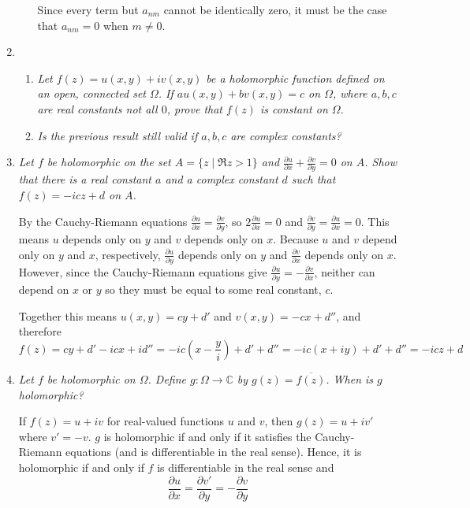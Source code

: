 \documentclass[letterpaper, 11pt]{article}
\begin{document}
\begin{enumerate}
\begin{enumerate}
Since every term but $a_{nm}$ cannot be identically zero, it must be the case that $a_{nm} = 0$ when $m \neq 0$.
\end{enumerate}

\item
\begin{enumerate}
\item \emph{Let $f(z) = u(x,y) + iv(x,y)$ be a holomorphic function defined on an open, connected set $\Omega$.  If $au(x,y) + bv(x,y) = c$ on $\Omega$, where $a,b,c$ are real constants not all $0$, prove that $f(z)$ is constant on $\Omega$.}
\item \emph{Is the previous result still valid if $a,b,c$ are complex constants?}
\end{enumerate}

\item \emph{Let $f$ be holomorphic on the set $A = \{z \mid \Re z > 1\}$ and $\frac{\partial u}{\partial x} + \frac{\partial v}{\partial y} = 0$ on $A$.  Show that there is a real constant $a$ and a complex constant $d$ such that $f(z) = -icz + d$ on $A$.}

By the Cauchy-Riemann equations $\frac{\partial u}{\partial x} = \frac{\partial v}{\partial y}$, so $2 \frac{\partial u}{\partial x} = 0$ and $\frac{\partial v}{\partial y} = \frac{\partial u}{\partial x} = 0$.  This means $u$ depends only on $y$ and $v$ depends only on $x$.  Because $u$ and $v$ depend only on $y$ and $x$, respectively, $\frac{\partial u}{\partial y}$ depends only on $y$ and $\frac{\partial v}{\partial x}$ depends only on $x$.  However, since the Cauchy-Riemann equations give $\frac{\partial u}{\partial y} = - \frac{\partial v}{\partial x}$, neither can depend on $x$ or $y$ so they must be equal to some real constant, $c$.

Together this means $u(x,y) = cy + d'$ and $v(x,y) = -cx + d''$, and therefore
\[
f(z) = cy + d' - icx + id'' =  -ic\left(x - \frac{y}{i}\right) + d' + d'' = -ic(x+iy) + d' + d'' = -icz + d
\]

\item \emph{Let $f$ be holomorphic on $\Omega$.  Define $g : \Omega \rightarrow \mathbb{C}$ by $g(z) = \overline{f(z)}$.  When is $g$ holomorphic?}

If $f(z) = u + iv$ for real-valued functions $u$ and $v$, then $g(z) = u + iv'$ where $v' = -v$.  $g$ is holomorphic if and only if it satisfies the Cauchy-Riemann equations (and is differentiable in the real sense).  Hence, it is holomorphic if and only if $f$ is differentiable in the real sense and 
\[
\frac{\partial u}{\partial x} = \frac{\partial v'}{\partial y} = - \frac{\partial v}{\partial y}
\]


\end{enumerate}
\end{document}
